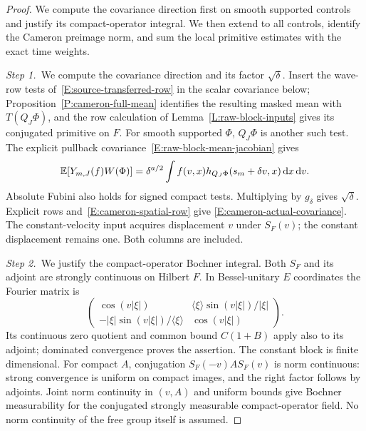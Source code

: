 \begin{proof}
  We compute the covariance direction first on smooth supported controls and
  justify its compact-operator integral. We then extend to all controls,
  identify the Cameron preimage norm, and sum the local primitive estimates
  with the exact time weights.


  \medskip
  \noindent\textit{Step 1.~}We compute the covariance direction and its factor
  $\sqrt\delta$.
  Insert the wave-row tests of~\eqref{E:source-transferred-row} in the scalar
  covariance below; Proposition~\ref{P:cameron-full-mean} identifies the
  resulting masked mean with $T(Q_J\Phi)$, and the row calculation of
  Lemma~\ref{L:raw-block-inputs} gives its conjugated primitive on $F$.
  For smooth supported $\Phi$, $Q_J\Phi$ is another such test. The explicit
  pullback covariance~\eqref{E:raw-block-mean-jacobian} gives
  \[
    \mathbb{E}[Y_{m,J}(f)W(\Phi)]
    =\delta^{a/2}\int f(v,x)
    h_{Q_J\Phi}(s_m+\delta v,x)\,\mathrm{d} x\,\mathrm{d} v .
  \]
  Absolute Fubini also holds for signed compact tests. Multiplying by $g_\delta$
  gives $\sqrt\delta$. Explicit rows and~\eqref{E:cameron-spatial-row} give
  \eqref{E:cameron-actual-covariance}. The constant-velocity input acquires
  displacement $v$ under $S_F(v)$; the constant displacement remains one. Both
  columns are included.


  \medskip
  \noindent\textit{Step 2.~}We justify the compact-operator Bochner integral.
  Both $S_F$ and its adjoint are strongly continuous on Hilbert $F$. In
  Bessel-unitary $E$ coordinates the Fourier matrix is
  \[
    \begin{pmatrix}
      \cos(v|\xi|)&\langle\xi\rangle\sin(v|\xi|)/|\xi|\\
      -|\xi|\sin(v|\xi|)/\langle\xi\rangle&\cos(v|\xi|)
    \end{pmatrix}.
  \]
  Its continuous zero quotient and common bound $C(1+B)$ apply also to its
  adjoint; dominated convergence proves the assertion. The constant block is
  finite dimensional. For compact $A$, conjugation $S_F(-v)AS_F(v)$ is norm
  continuous: strong convergence is uniform on compact images, and the right
  factor follows by adjoints. Joint norm continuity in $(v,A)$ and uniform
  bounds give Bochner measurability for the conjugated strongly measurable
  compact-operator field. No norm continuity of the free group itself is
  assumed.



\end{proof}
